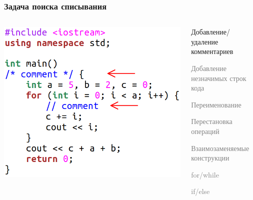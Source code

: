 \documentclass[10pt]{beamer}
\begin{document}
\begin{frame}[fragile]\frametitle{Задача поиска списывания}
	\begin{columns}[T]
		\centering
		\includegraphics[scale=0.7]{comment.png}
		
		\centering
		\begin{itemize}
			\item Добавление/удаление комментариев
			\textcolor{gray}{
				\item Добавление незначимых строк кода
			\item Переименование
			\item Перестановка операций
			\item Взаимозаменяемые конструкции
		}
			\begin{itemize}
				\item \textcolor{gray}{for/while
				\item if/else
			}
			\end{itemize}
		\end{itemize}
	\end{columns}
\end{frame}
\end{document}
